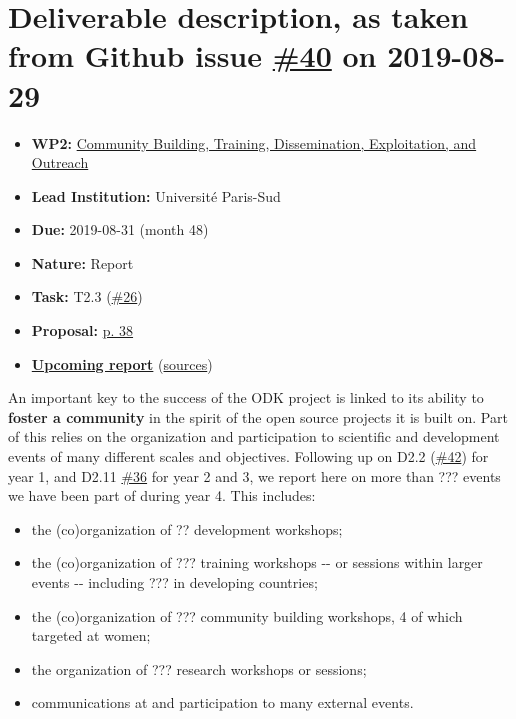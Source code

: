 \hypertarget{deliverable-description-as-taken-from-github-issue-40-on-2019-08-29}{%
\section*{\texorpdfstring{Deliverable description, as taken from Github
issue
\href{https://github.com/OpenDreamKit/OpenDreamKit/issues/40}{\#40} on
2019-08-29}{Deliverable description, as taken from Github issue \#40 on 2019-08-29}}\label{deliverable-description-as-taken-from-github-issue-40-on-2019-08-29}}

\begin{itemize}
\tightlist
\item
  \textbf{WP2:}
  \href{https://github.com/OpenDreamKit/OpenDreamKit/tree/master/WP2}{Community
  Building, Training, Dissemination, Exploitation, and Outreach}
\item
  \textbf{Lead Institution:} Université Paris-Sud
\item
  \textbf{Due:} 2019-08-31 (month 48)
\item
  \textbf{Nature:} Report
\item
  \textbf{Task:} T2.3
  (\href{https://github.com/OpenDreamKit/OpenDreamKit/issues/26}{\#26})
\item
  \textbf{Proposal:}
  \href{https://github.com/OpenDreamKit/OpenDreamKit/raw/master/Proposal/proposal-www.pdf}{p.
  38}
\item
  \textbf{\href{https://github.com/OpenDreamKit/OpenDreamKit/raw/master/WP2/D2.15/report-final.pdf}{Upcoming
  report}}
  (\href{https://github.com/OpenDreamKit/OpenDreamKit/raw/master/WP2/D2.15/}{sources})
\end{itemize}

An important key to the success of the ODK project is linked to its
ability to \textbf{foster a community} in the spirit of the open source
projects it is built on. Part of this relies on the organization and
participation to scientific and development events of many different
scales and objectives. Following up on D2.2
(\href{https://github.com/OpenDreamKit/OpenDreamKit/issues/42}{\#42})
for year 1, and D2.11
\href{https://github.com/OpenDreamKit/OpenDreamKit/issues/36}{\#36} for
year 2 and 3, we report here on more than ??? events we have been part
of during year 4. This includes:

\begin{itemize}
\tightlist
\item
  the (co)organization of ?? development workshops;
\item
  the (co)organization of ??? training workshops -\/- or sessions within
  larger events -\/- including ??? in developing countries;
\item
  the (co)organization of ??? community building workshops, 4 of which
  targeted at women;
\item
  the organization of ??? research workshops or sessions;
\item
  communications at and participation to many external events.
\end{itemize}

